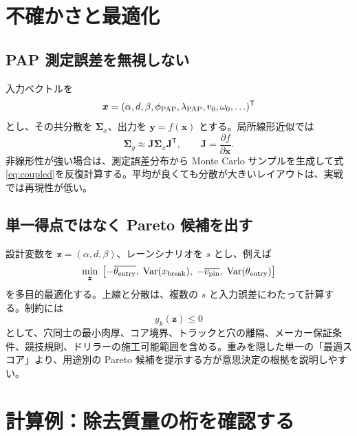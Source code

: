 \documentclass[11pt,a4paper]{article}
\newcommand{\vect}[1]{\bm{#1}}
\newcommand{\mat}[1]{\bm{#1}}
\begin{document}
\section{不確かさと最適化}

\subsection{PAP 測定誤差を無視しない}

入力ベクトルを
\begin{equation}
 \vect x=(\alpha,d,\beta,\phi_{\rm PAP},\lambda_{\rm PAP},v_0,\omega_0,\ldots)^{\mathsf T}
\end{equation}
とし、その共分散を $\mat\Sigma_x$、出力を $\vect y=f(\vect x)$ とする。局所線形近似では
\begin{equation}
 \mat\Sigma_y\approx\mat J\mat\Sigma_x\mat J^{\mathsf T},
 \qquad
 \mat J=\frac{\partial f}{\partial\vect x}.
 \label{eq:covariance}
\end{equation}
非線形性が強い場合は、測定誤差分布から Monte Carlo サンプルを生成して式\eqref{eq:coupled}を反復計算する。平均が良くても分散が大きいレイアウトは、実戦では再現性が低い。

\subsection{単一得点ではなく Pareto 候補を出す}

設計変数を $\vect z=(\alpha,d,\beta)$、レーンシナリオを $s$ とし、例えば
\begin{equation}
 \min_{\vect z}\;
 \left[
 -\overline{\theta_{\rm entry}},\;
 \operatorname{Var}(x_{\rm break}),\;
 -\overline{v_{\rm pin}},\;
 \operatorname{Var}(\theta_{\rm entry})
 \right]
 \label{eq:pareto}
\end{equation}
を多目的最適化する。上線と分散は、複数の $s$ と入力誤差にわたって計算する。制約には
\begin{equation}
 g_k(\vect z)\le0
\end{equation}
として、穴同士の最小肉厚、コア境界、トラックと穴の離隔、メーカー保証条件、競技規則、ドリラーの施工可能範囲を含める。重みを隠した単一の「最適スコア」より、用途別の Pareto 候補を提示する方が意思決定の根拠を説明しやすい。

\section{計算例：除去質量の桁を確認する}
\end{document}
